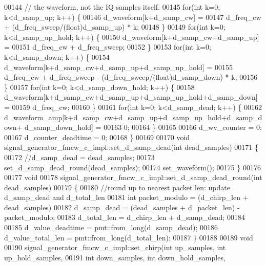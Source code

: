 \begin{DoxyCode}
00144       \textcolor{comment}{// the waveform, not the IQ samples itself.}
00145       \textcolor{keywordflow}{for}(\textcolor{keywordtype}{int} k=0; k<d_samp_up; k++) \{
00146         d_waveform[k+d_samp_cw] =
00147           d_freq_cw + (d_freq_sweep/(float)d\_samp\_up) * k;
00148       \}
00149       \textcolor{keywordflow}{for}(\textcolor{keywordtype}{int} k=0; k<d_samp_up_hold; k++) \{
00150         d_waveform[k+d_samp_cw+d_samp_up] =
00151           d_freq_cw + d_freq_sweep;
00152       \}
00153       \textcolor{keywordflow}{for}(\textcolor{keywordtype}{int} k=0; k<d_samp_down; k++) \{
00154         d_waveform[k+d_samp_cw+d\_samp\_up+d_samp_up_hold] =
00155           d_freq_cw + d_freq_sweep - (d_freq_sweep/(float)d\_samp\_down) * k;
00156       \}
00157       \textcolor{keywordflow}{for}(\textcolor{keywordtype}{int} k=0; k<d_samp_down_hold; k++) \{
00158       d_waveform[k+d_samp_cw+d\_samp\_up+d\_samp\_up\_hold+d_samp_down] =
00159           d_freq_cw;
00160       \}
00161       \textcolor{keywordflow}{for}(\textcolor{keywordtype}{int} k=0; k<d_samp_dead; k++) \{
00162       d_waveform_amp[k+d_samp_cw+d\_samp\_up+d\_samp\_up\_hold+d\_samp\_down+
      d_samp_down_hold] =
00163           0;
00164       \}
00165 
00166       d_wv_counter = 0;
00167       d_counter_deadtime = 0;
00168     \}
00169 
00170     \textcolor{keywordtype}{void}  signal_generator_fmcw_c_impl::set_d_samp_dead(\textcolor{keywordtype}{int} dead\_samples)
00171     \{
00172       \textcolor{comment}{//d\_samp\_dead = dead\_samples;}
00173       set_d_samp_dead_round(dead\_samples);
00174       set_waveform();
00175     \}
00176 
00177     \textcolor{keywordtype}{void}
00178     signal_generator_fmcw_c_impl::set_d_samp_dead_round(\textcolor{keywordtype}{int} dead\_samples)
00179     \{
00180       \textcolor{comment}{//round up to nearest packet len: update d\_samp\_dead and d\_total\_len}
00181       \textcolor{keywordtype}{int} packet\_modulo = (d_chirp_len + dead\_samples) %
00182       d_samp_dead = (dead\_samples + d_packet_len) - packet\_modulo;
00183       d_total_len = d_chirp_len + d_samp_dead;
00184 
00185       d_value_deadtime = pmt::from\_long(d\_samp\_dead);
00186       d_value_total_len = pmt::from\_long(d_total_len);
00187     \}
00188 
00189     \textcolor{keywordtype}{void}
00190     signal_generator_fmcw_c_impl::set_chirp(\textcolor{keywordtype}{int} up\_samples, \textcolor{keywordtype}{int} up\_hold\_samples,
00191                                             \textcolor{keywordtype}{int} down\_samples, \textcolor{keywordtype}{int} down\_hold\_samples,

\end{DoxyCode}
